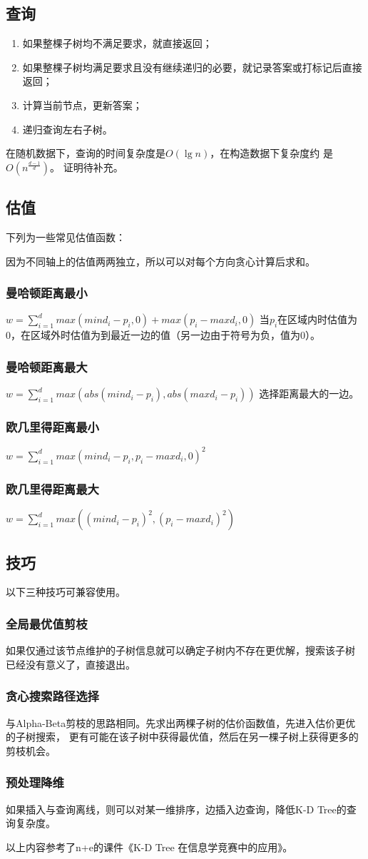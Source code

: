 \subsection{查询}
\begin{enumerate}
	\item 如果整棵子树均不满足要求，就直接返回；
	\item 如果整棵子树均满足要求且没有继续递归的必要，就记录答案或打标记后直接返回；
	\item 计算当前节点，更新答案；
	\item 递归查询左右子树。
\end{enumerate}
在随机数据下，查询的时间复杂度是$O(\lg n)$，在构造数据下复杂度约
是$O(n^\frac{d-1}{d})$。
证明待补充。
\subsection{估值}
下列为一些常见估值函数：

因为不同轴上的估值两两独立，所以可以对每个方向贪心计算后求和。
\subsubsection{曼哈顿距离最小}
$\displaystyle w=\sum_{i=1}^d{max(mind_i-p_i,0)+max(p_i-maxd_i,0)}$
当$p_i$在区域内时估值为0，在区域外时估值为到最近一边的值（另一边由于符号为负，值为0）。
\subsubsection{曼哈顿距离最大}
$\displaystyle w=\sum_{i=1}^d{max(abs(mind_i-p_i),abs(maxd_i-p_i))}$
选择距离最大的一边。
\subsubsection{欧几里得距离最小}
$\displaystyle w=\sum_{i=1}^d{max(mind_i-p_i,p_i-maxd_i,0)^2}$
\subsubsection{欧几里得距离最大}
$\displaystyle w=\sum_{i=1}^d{max((mind_i-p_i)^2,(p_i-maxd_i)^2)}$
\subsection{技巧}
以下三种技巧可兼容使用。
\subsubsection{全局最优值剪枝}
如果仅通过该节点维护的子树信息就可以确定子树内不存在更优解，搜索该子树
已经没有意义了，直接退出。
\subsubsection{贪心搜索路径选择}
与Alpha-Beta剪枝的思路相同。先求出两棵子树的估价函数值，先进入估价更优的子树搜索，
更有可能在该子树中获得最优值，然后在另一棵子树上获得更多的剪枝机会。
\subsubsection{预处理降维}
如果插入与查询离线，则可以对某一维排序，边插入边查询，降低K-D Tree的查询复杂度。

以上内容参考了n+e的课件《K-D Tree 在信息学竞赛中的应用》\cite{kdTree}。
